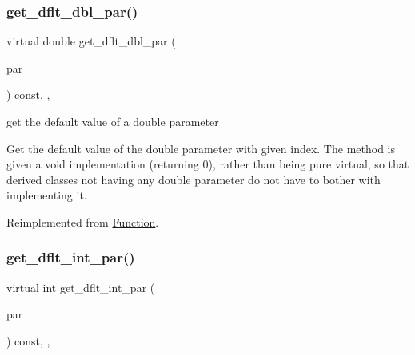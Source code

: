 \subsubsection{\texorpdfstring{get\+\_\+dflt\+\_\+dbl\+\_\+par()}{get\_dflt\_dbl\_par()}}
{\footnotesize\ttfamily virtual double get\+\_\+dflt\+\_\+dbl\+\_\+par (\begin{DoxyParamCaption}\item[{const \mbox{\hyperlink{class_s_m_spp__di__unipi__it_1_1_thin_compute_interface_aa3d710629ad8c434286726ad810c3b47}{idx\+\_\+type}}}]{par }\end{DoxyParamCaption}) const\hspace{0.3cm}{\ttfamily [inline]}, {\ttfamily [override]}, {\ttfamily [virtual]}}



get the default value of a double parameter 

Get the default value of the double parameter with given index. The method is given a void implementation (returning 0), rather than being pure virtual, so that derived classes not having any double parameter do not have to bother with implementing it. 

Reimplemented from \mbox{\hyperlink{class_s_m_spp__di__unipi__it_1_1_function_a465a771c115acf8d5f4e32e22f003014}{Function}}.

\mbox{\label{class_s_m_spp__di__unipi__it_1_1_c05_function_a75dd1491b74c4b9476755e061dce3e04}} 
\subsubsection{\texorpdfstring{get\+\_\+dflt\+\_\+int\+\_\+par()}{get\_dflt\_int\_par()}}
{\footnotesize\ttfamily virtual int get\+\_\+dflt\+\_\+int\+\_\+par (\begin{DoxyParamCaption}\item[{const \mbox{\hyperlink{class_s_m_spp__di__unipi__it_1_1_thin_compute_interface_aa3d710629ad8c434286726ad810c3b47}{idx\+\_\+type}}}]{par }\end{DoxyParamCaption}) const\hspace{0.3cm}{\ttfamily [inline]}, {\ttfamily [override]}, {\ttfamily [virtual]}}



